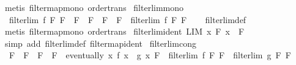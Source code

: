 \begin{isabellebody}
\ {\isacharparenleft}{\kern0pt}metis\ filtermap{\isacharunderscore}{\kern0pt}mono\ order{\isacharunderscore}{\kern0pt}trans{\isacharparenright}{\kern0pt}%
\endisatagproof
{\isafoldproof}%
%
\isadelimproof
\isanewline
%
\endisadelimproof
\isanewline
{}\isamarkupfalse%
\ filterlim{\isacharunderscore}{\kern0pt}mono{\isacharcolon}{\kern0pt}\isanewline
\ \ {\isachardoublequoteopen}filterlim\ f\ F{}\ F{}\ {\isasymLongrightarrow}\ F{}\ {\isasymle}\ F{}{\isacharprime}{\kern0pt}\ {\isasymLongrightarrow}\ F{}{\isacharprime}{\kern0pt}\ {\isasymle}\ F{}\ {\isasymLongrightarrow}\ filterlim\ f\ F{}{\isacharprime}{\kern0pt}\ F{}{\isacharprime}{\kern0pt}{\isachardoublequoteclose}\isanewline
%
\isadelimproof
\ \ %
\endisadelimproof
%
\isatagproof
{}\isamarkupfalse%
\ filterlim{\isacharunderscore}{\kern0pt}def\ \isamarkupfalse%
\ {\isacharparenleft}{\kern0pt}metis\ filtermap{\isacharunderscore}{\kern0pt}mono\ order{\isacharunderscore}{\kern0pt}trans{\isacharparenright}{\kern0pt}%
\endisatagproof
{\isafoldproof}%
%
\isadelimproof
\isanewline
%
\endisadelimproof
\isanewline
{}\isamarkupfalse%
\ filterlim{\isacharunderscore}{\kern0pt}ident{\isacharcolon}{\kern0pt}\ {\isachardoublequoteopen}LIM\ x\ F{\isachardot}{\kern0pt}\ x\ {\isacharcolon}{\kern0pt}{\isachargreater}{\kern0pt}\ F{\isachardoublequoteclose}\isanewline
%
\isadelimproof
\ \ %
\endisadelimproof
%
\isatagproof
{}\isamarkupfalse%
\ {\isacharparenleft}{\kern0pt}simp\ add{\isacharcolon}{\kern0pt}\ filterlim{\isacharunderscore}{\kern0pt}def\ filtermap{\isacharunderscore}{\kern0pt}ident{\isacharparenright}{\kern0pt}%
\endisatagproof
{\isafoldproof}%
%
\isadelimproof
\isanewline
%
\endisadelimproof
\isanewline
{}\isamarkupfalse%
\ filterlim{\isacharunderscore}{\kern0pt}cong{\isacharcolon}{\kern0pt}\isanewline
\ \ {\isachardoublequoteopen}F{}\ {\isacharequal}{\kern0pt}\ F{}{\isacharprime}{\kern0pt}\ {\isasymLongrightarrow}\ F{}\ {\isacharequal}{\kern0pt}\ F{}{\isacharprime}{\kern0pt}\ {\isasymLongrightarrow}\ eventually\ {\isacharparenleft}{\kern0pt}{\isasymlambda}x{\isachardot}{\kern0pt}\ f\ x\ {\isacharequal}{\kern0pt}\ g\ x{\isacharparenright}{\kern0pt}\ F{}\ {\isasymLongrightarrow}\ filterlim\ f\ F{}\ F{}\ {\isacharequal}{\kern0pt}\ filterlim\ g\ F{}{\isacharprime}{\kern0pt}\ F{}{\isacharprime}{\kern0pt}{\isachardoublequoteclose}\isanewline

\end{isabellebody}

